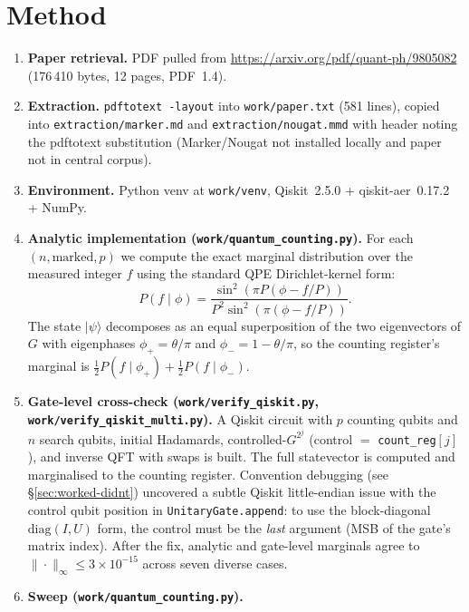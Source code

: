 \documentclass[11pt]{article}
\begin{document}
\section{Method}
\begin{enumerate}
  \item \textbf{Paper retrieval.} PDF pulled from
        \url{https://arxiv.org/pdf/quant-ph/9805082}
        (176\,410 bytes, 12 pages, PDF~1.4).
  \item \textbf{Extraction.} \texttt{pdftotext -layout} into
        \texttt{work/paper.txt} (581 lines), copied into
        \texttt{extraction/marker.md} and \texttt{extraction/nougat.mmd} with
        header noting the pdftotext substitution (Marker/Nougat not installed
        locally and paper not in central corpus).
  \item \textbf{Environment.} Python venv at \texttt{work/venv},
        Qiskit~2.5.0 + qiskit-aer~0.17.2 + NumPy.
  \item \textbf{Analytic implementation
        (\texttt{work/quantum\_counting.py}).}
        For each $(n, \text{marked}, p)$ we compute the exact marginal
        distribution over the measured integer $f$ using the standard QPE
        Dirichlet-kernel form:
        \[
          P(f\mid\phi) = \frac{\sin^2(\pi P(\phi - f/P))}{P^2\sin^2(\pi(\phi - f/P))}.
        \]
        The state $|\psi\rangle$ decomposes as an equal superposition of the
        two eigenvectors of $G$ with eigenphases
        $\phi_+ = \theta/\pi$ and $\phi_- = 1 - \theta/\pi$, so the counting
        register's marginal is $\tfrac12 P(f\mid\phi_+) + \tfrac12 P(f\mid\phi_-)$.
  \item \textbf{Gate-level cross-check (\texttt{work/verify\_qiskit.py},
        \texttt{work/verify\_qiskit\_multi.py}).}
        A Qiskit circuit with $p$ counting qubits and $n$ search qubits, initial
        Hadamards, controlled-$G^{2^j}$ (control $=$ \texttt{count\_reg}$[j]$),
        and inverse QFT with swaps is built. The full statevector is computed
        and marginalised to the counting register. Convention debugging (see
        \S\ref{sec:worked-didnt}) uncovered a subtle Qiskit little-endian issue
        with the control qubit position in \texttt{UnitaryGate.append}: to use
        the block-diagonal $\mathrm{diag}(I,U)$ form, the control must be the
        \emph{last} argument (MSB of the gate's matrix index). After the fix,
        analytic and gate-level marginals agree to
        $\|\cdot\|_\infty \le 3\!\times\!10^{-15}$ across seven diverse cases.
  \item \textbf{Sweep (\texttt{work/quantum\_counting.py}).}

\end{enumerate}
\end{document}
